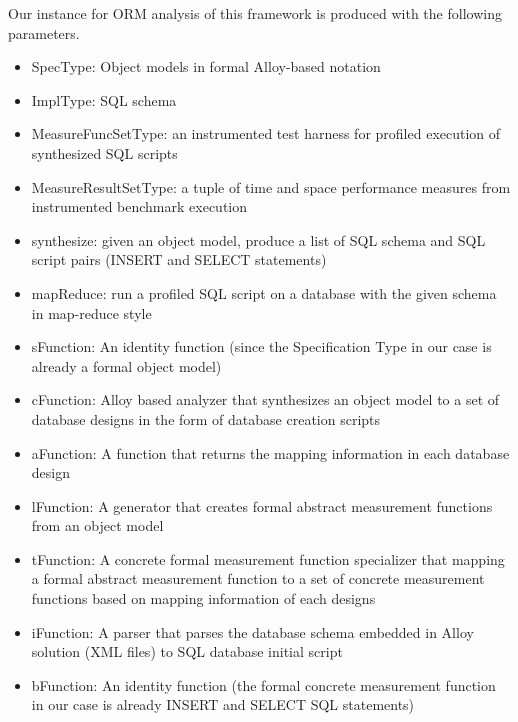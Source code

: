 \documentclass[10pt,conference]{IEEEtran}
\begin{document}
Our instance for ORM analysis of this framework is produced with the following parameters.
\begin{itemize}
\setlength{\itemsep}{0pt}
\setlength{\parskip}{0pt}
\item \textsf{SpecType}: Object models in formal Alloy-based notation
\item \textsf{ImplType}: SQL schema
\item \textsf{MeasureFuncSetType}: an instrumented test harness for profiled execution of synthesized SQL scripts
\item \textsf{MeasureResultSetType}: a tuple of time and space performance measures from instrumented benchmark execution
\item \textsf{synthesize}: given an object model, produce a list of SQL schema and SQL script pairs (INSERT and SELECT statements) 
\item \textsf{mapReduce}: run a profiled SQL script on a database with the given schema in map-reduce style %
\item \textsf{sFunction}: An identity function (since the Specification Type in our case is already a formal object model)
\item \textsf{cFunction}: Alloy based analyzer that synthesizes an object model to a set of database designs in the form of database creation scripts
\item \textsf{aFunction}: A function that returns the mapping information in each database design
\item \textsf{lFunction}: A generator that creates formal abstract measurement functions from an object model
\item \textsf{tFunction}: A concrete formal measurement function specializer that mapping a formal abstract measurement function to a set of concrete measurement functions based on mapping information of each designs
\item \textsf{iFunction}: A parser that parses the database schema embedded in Alloy solution (XML files) to SQL database initial script
\item \textsf{bFunction}: An identity function (the formal concrete measurement function in our case is already INSERT and SELECT SQL statements)
\end{itemize}

 
\end{document}
